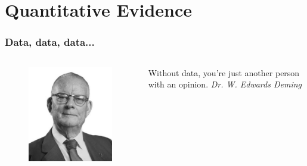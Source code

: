 \documentclass{beamer}
\begin{document}
\section{Quantitative Evidence}
\begin{frame}
\frametitle{\large Data, data, data...}
 \begin{columns}
    \begin{column}{0.37\textwidth}
    \begin{figure}
      \includegraphics[width=\textwidth]{img/edward_deming.png}
     \end{figure}
     
    \end{column}
    \begin{column}{0.55\textwidth}  %
    \hspace{-0.1cm}
    \centering\Large Without data, you're just another person with an opinion.\newline\newline
     \centering\small\textit{Dr. W. Edwards Deming}
\end{column}
\end{columns}
\end{frame}
\end{document}
